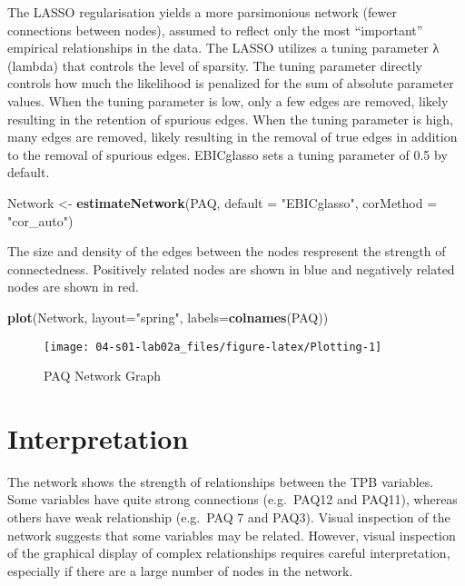 \documentclass[]{book}
\newenvironment{Shaded}{\begin{snugshade}}{\end{snugshade}}
\newcommand{\DataTypeTok}[1]{\textcolor[rgb]{0.13,0.29,0.53}{#1}}
\newcommand{\KeywordTok}[1]{\textcolor[rgb]{0.13,0.29,0.53}{\textbf{#1}}}
\newcommand{\NormalTok}[1]{#1}
\newcommand{\StringTok}[1]{\textcolor[rgb]{0.31,0.60,0.02}{#1}}
\begin{document}
The LASSO regularisation yields a more parsimonious network (fewer connections between nodes), assumed to reflect only the most ``important'' empirical relationships in the data. The LASSO utilizes a tuning parameter λ (lambda) that controls the level of sparsity. The tuning parameter directly controls how much the likelihood is penalized for the sum of absolute parameter values. When the tuning parameter is low, only a few edges are removed, likely resulting in the retention of spurious edges. When the tuning parameter is high, many edges are removed, likely resulting in the removal of true edges in addition to the removal of spurious edges. EBICglasso sets a tuning parameter of 0.5 by default.

\begin{Shaded}
\begin{Highlighting}[]
\NormalTok{Network <-}\StringTok{ }\KeywordTok{estimateNetwork}\NormalTok{(PAQ, }\DataTypeTok{default =} \StringTok{"EBICglasso"}\NormalTok{, }\DataTypeTok{corMethod =} \StringTok{"cor_auto"}\NormalTok{)}
\end{Highlighting}
\end{Shaded}

The size and density of the edges between the nodes respresent the strength of connectedness. Positively related nodes are shown in { blue} and negatively related nodes are shown in {red}.

\begin{Shaded}
\begin{Highlighting}[]
\KeywordTok{plot}\NormalTok{(Network, }\DataTypeTok{layout=}\StringTok{"spring"}\NormalTok{, }\DataTypeTok{labels=}\KeywordTok{colnames}\NormalTok{(PAQ))}
\end{Highlighting}
\end{Shaded}

\begin{figure}

{\centering \texttt{[image: 04-s01-lab02a\_files/figure-latex/Plotting-1]} 

}

\caption{PAQ Network Graph}\label{fig:Plotting}
\end{figure}

\hypertarget{interpretation}{%
\section{Interpretation}\label{interpretation}}

The network shows the strength of relationships between the TPB variables. Some variables have quite strong connections (e.g.~PAQ12 and PAQ11), whereas others have weak relationship (e.g.~PAQ 7 and PAQ3). Visual inspection of the network suggests that some variables may be related. However, visual inspection of the graphical display of complex relationships requires careful interpretation, especially if there are a large number of nodes in the network.
\end{document}

